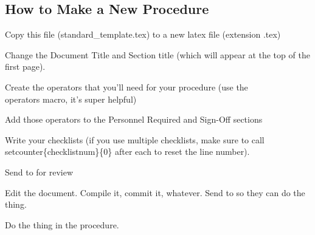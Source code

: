 \subsection{How to Make a New Procedure}
\begin{checklist}
    \item \auth{} Copy this file (standard\_template.tex) to a new latex file (extension .tex)
    \item \auth{} Change the Document Title and Section title (which will appear at the top of the first page).
    \item \auth{} Create the operators that you'll need for your procedure (use the \\operators macro, it's super helpful)
    \item \auth{} Add those operators to the Personnel Required and Sign-Off sections
    \item \auth{} Write your checklists (if you use multiple checklists, make sure to call \\setcounter\{checklistnum\}\{0\} after each to reset the line number).
    \item \auth{} Send to \edi{} for review
    \item \edi{} Edit the document. Compile it, commit it, whatever. Send to \perf{} so they can do the thing.
    \item \perf{} Do the thing in the procedure.
\end{checklist}
\setcounter{checklistnum}{0}


